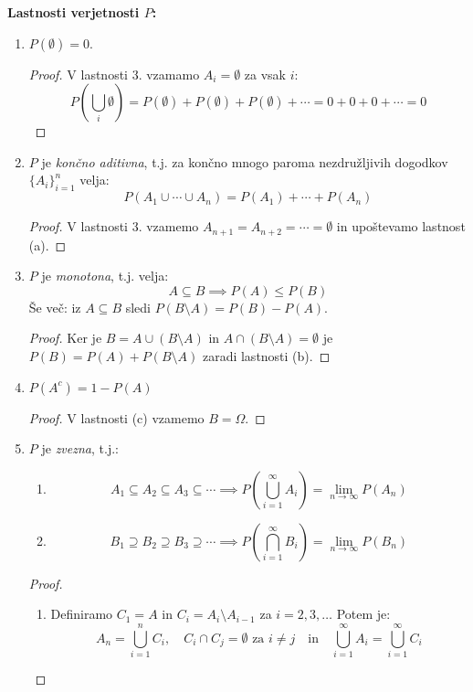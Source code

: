 \documentclass[12pt]{book}
\def\n{\noindent}
\theoremstyle{definition}
\theoremstyle{plain}
\theoremstyle{plain}
\theoremstyle{plain}
\theoremstyle{remark}
\begin{document}
\n \textbf{Lastnosti verjetnosti $P$:}

\begin{enumerate}[label=(\alph*)]
    \item $P(\emptyset) = 0$. 
    \begin{proof}
        V lastnosti 3. vzamamo $A_i = \emptyset$ za vsak $i$: 
        $$
        P\left(\bigcup_i \emptyset\right)=P(\emptyset)+P(\emptyset)+P(\emptyset)+\cdots = 0+0+0+ \cdots = 0
        $$
    \end{proof}
    \item $P$ je \emph{končno aditivna}, t.j. za končno mnogo paroma nezdružljivih dogodkov $\{A_i\}_{i=1}^{n}$ velja: 
    $$
    P\left(A_1 \cup \cdots \cup A_n\right)=P\left(A_1\right)+\cdots+P\left(A_n\right)
    $$
    \begin{proof}
        V lastnosti 3. vzamemo $A_{n+1}=A_{n+2}=\cdots=\emptyset$ in upoštevamo lastnost (a). 
    \end{proof}
    \item $P$ je \emph{monotona}, t.j. velja: 
    $$
    A \subseteq B \implies P(A) \leq P(B)
    $$ 
    Še več: iz $A \subseteq B$  sledi $P(B \setminus A)=P(B)-P(A)$.
    \begin{proof}
        Ker je $B=A \cup(B \setminus A)$ in $A \cap(B \setminus A)=\emptyset$ je $P(B)=P(A)+P(B \setminus A)$ zaradi lastnosti (b).
    \end{proof}
    \item $P(A^c) = 1-P(A)$
    \begin{proof}
        V lastnosti (c) vzamemo $B = \Omega$.
    \end{proof}
    \item $P$ je \emph{zvezna}, t.j.:
    
    \begin{enumerate}[label=(\roman*)]
        \item $$ A_1 \subseteq A_2 \subseteq A_3 \subseteq \cdots \implies P\left(\bigcup_{i=1}^{\infty} A_i\right)=\lim _{n \to \infty} P\left(A_n\right)$$
        \item $$ B_1 \supseteq B_2 \supseteq B_3 \supseteq \cdots \implies P\left(\bigcap_{i=1}^{\infty} B_i\right)=\lim _{n \to \infty} P\left(B_n\right)$$
    \end{enumerate}

    \begin{proof} 
        ~

        \begin{enumerate}[label=(\roman*)]
            \item Definiramo $C_1 = A$ in $C_i = A_i \setminus A_{i-1}$ za $i = 2, 3, \ldots$ Potem je:
            $$
            A_n=\bigcup_{i=1}^n C_i, \quad C_i \cap C_j=\emptyset \text{ za } i \neq j \quad \text{in} \quad \bigcup_{i=1}^{\infty} A_i=\bigcup_{i=1}^{\infty} C_i
            $$ 
            

\end{enumerate}
\end{proof}
\end{enumerate}
\end{document}
